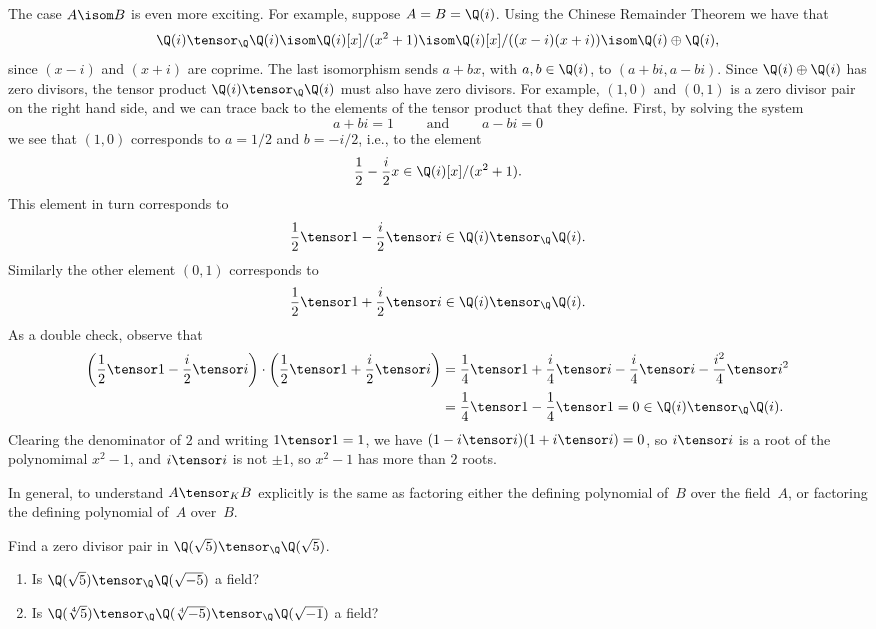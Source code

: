 \documentclass[11pt]{book}
\begin{document}
\begin{ch}
\begin{example}
  The case $A\isom B$ is even more exciting.  For example, suppose
  $A=B=\Q(i)$. Using the Chinese Remainder Theorem we have that
$$
  \Q(i)\tensor_\Q \Q(i) \isom \Q(i)[x]/(x^2+1)
\isom \Q(i)[x]/((x-i)(x+i))
\isom \Q(i) \oplus \Q(i),
$$
since $(x-i)$ and $(x+i)$ are coprime.  The last isomorphism
sends $a + b x$, with $a,b\in\Q(i)$, to $(a+bi, a-bi)$.
Since $\Q(i)\oplus \Q(i)$ has zero divisors, the tensor
product $\Q(i)\tensor_\Q \Q(i)$ must also have zero divisors.
For example, $(1,0)$ and $(0,1)$ is a zero divisor pair
on the right hand side, and we can trace back to the elements
of the tensor product that they define.  First, by solving
the system
$$ a+bi=1\qquad \text{ and }\qquad a-bi=0$$
we see that
$(1,0)$ corresponds to $a=1/2$ and $b=-i/2$, i.e., to the element
$$\frac{1}{2}- \frac{i}{2} x\in \Q(i)[x]/(x^2+1).$$
This element in turn
corresponds to
$$
\frac{1}{2}\tensor 1 - \frac{i}{2}\tensor i \in \Q(i)\tensor_\Q\Q(i).
$$
Similarly the other element $(0,1)$ corresponds to
$$
 \frac{1}{2}\tensor 1 + \frac{i}{2}\tensor i \in \Q(i)\tensor_\Q\Q(i).
$$
As a double check, observe that
\begin{align*}
\left(\frac{1}{2}\tensor 1 - \frac{i}{2}\tensor i\right)\cdot
 \left(\frac{1}{2}\tensor 1 + \frac{i}{2}\tensor i\right)
&= \frac{1}{4}\tensor 1 + \frac{i}{4}\tensor i - \frac{i}{4}\tensor i
    -\frac{i^2}{4}\tensor i^2\\
 &= \frac{1}{4}\tensor 1 - \frac{1}{4}\tensor 1 = 0 \in \Q(i)\tensor_\Q\Q(i).
\end{align*}
Clearing the denominator of $2$ and writing $1\tensor 1 = 1$, we have
$(1-i\tensor i)(1+i\tensor i) = 0$, so $i\tensor i$ is a root of the
polynomimal $x^2-1$, and $i\tensor i$ is not $\pm 1$, so $x^2-1$ has
more than $2$ roots.

In general, to understand $A\tensor_K B$ explicitly
is the same as factoring either the defining polynomial of~$B$
over the field~$A$, or factoring the defining polynomial of~$A$
over~$B$.
\end{example}

\begin{exercise}\label{ex:normed3}
Find a zero divisor pair in $\Q(\sqrt{5})\tensor_\Q\Q(\sqrt{5})$.
\end{exercise}

\begin{exercise}\label{ex:normed4}
\begin{enumerate}
\item Is $\Q(\sqrt{5})\tensor_\Q\Q(\sqrt{-5})$ a field?
\item Is $\Q(\sqrt[4]{5})\tensor_\Q\Q(\sqrt[4]{-5})\tensor_\Q\Q(\sqrt{-1})$ a field?
\end{enumerate}
\end{exercise}


\end{ch}
\end{document}
